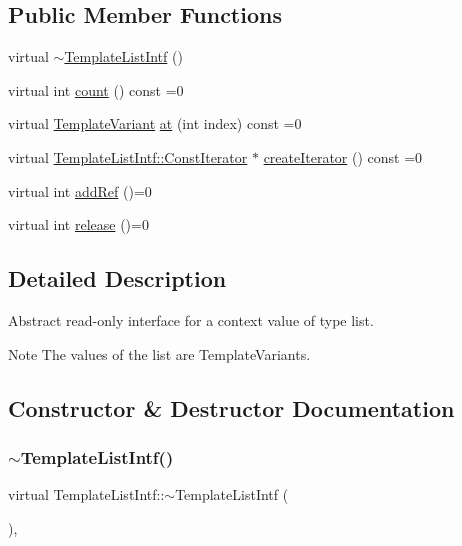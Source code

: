 \subsection*{Public Member Functions}
\begin{DoxyCompactItemize}
\item 
virtual \mbox{\hyperlink{class_template_list_intf_a0b5062df5445b0185ef6b072813307a2}{$\sim$\+Template\+List\+Intf}} ()
\item 
virtual int \mbox{\hyperlink{class_template_list_intf_a329e49e33484c2aa5106aac1bf4e5216}{count}} () const =0
\item 
virtual \mbox{\hyperlink{class_template_variant}{Template\+Variant}} \mbox{\hyperlink{class_template_list_intf_aa51e57e72eacf4e8ce1055ee30a0f7f8}{at}} (int index) const =0
\item 
virtual \mbox{\hyperlink{class_template_list_intf_1_1_const_iterator}{Template\+List\+Intf\+::\+Const\+Iterator}} $\ast$ \mbox{\hyperlink{class_template_list_intf_a56b82384db24c3e121076a1da046d378}{create\+Iterator}} () const =0
\item 
virtual int \mbox{\hyperlink{class_template_list_intf_a4b4973e2e15396d10bc4e3085462ca2b}{add\+Ref}} ()=0
\item 
virtual int \mbox{\hyperlink{class_template_list_intf_a0c53169c740c09dac47efc62bbe39674}{release}} ()=0
\end{DoxyCompactItemize}


\subsection{Detailed Description}
Abstract read-\/only interface for a context value of type list. 

\begin{DoxyNote}{Note}
The values of the list are Template\+Variants. 
\end{DoxyNote}


\subsection{Constructor \& Destructor Documentation}
\mbox{\label{class_template_list_intf_a0b5062df5445b0185ef6b072813307a2}} 
\subsubsection{\texorpdfstring{$\sim$TemplateListIntf()}{~TemplateListIntf()}}
{\footnotesize\ttfamily virtual Template\+List\+Intf\+::$\sim$\+Template\+List\+Intf (\begin{DoxyParamCaption}{ }\end{DoxyParamCaption})\hspace{0.3cm}{\ttfamily [inline]}, {\ttfamily [virtual]}}


